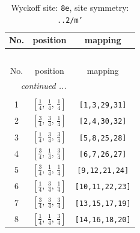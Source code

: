 \documentclass[fleqn,8pt]{jsarticle}
\begin{document}
\renewcommand{\arraystretch}{1.2}
\begin{longtable}{ccc}
\caption{Wyckoff site: {\tt 8e}, site symmetry: {\tt ..2/m'}}
 \\
 \hline \hline
No. & position & mapping \\ \hline \endfirsthead

\multicolumn{2}{l}{\tablename\ \thetable{}} \\
 \hline \hline
No. & position & mapping \\ \hline \endhead

 \hline \hline
\multicolumn{2}{r}{\footnotesize\it continued ...} \\ \endfoot

 \hline \hline
\multicolumn{2}{r}{} \\ \endlastfoot

1 & $\left[ \frac{1}{4},\, \frac{1}{4},\, \frac{1}{4} \right]$ & {\tt [1,3,29,31]} \\ \hline
2 & $\left[ \frac{3}{4},\, \frac{3}{4},\, \frac{1}{4} \right]$ & {\tt [2,4,30,32]} \\ \hline
3 & $\left[ \frac{1}{4},\, \frac{3}{4},\, \frac{3}{4} \right]$ & {\tt [5,8,25,28]} \\ \hline
4 & $\left[ \frac{3}{4},\, \frac{1}{4},\, \frac{3}{4} \right]$ & {\tt [6,7,26,27]} \\ \hline
5 & $\left[ \frac{3}{4},\, \frac{1}{4},\, \frac{1}{4} \right]$ & {\tt [9,12,21,24]} \\ \hline
6 & $\left[ \frac{1}{4},\, \frac{3}{4},\, \frac{1}{4} \right]$ & {\tt [10,11,22,23]} \\ \hline
7 & $\left[ \frac{3}{4},\, \frac{3}{4},\, \frac{3}{4} \right]$ & {\tt [13,15,17,19]} \\ \hline
8 & $\left[ \frac{1}{4},\, \frac{1}{4},\, \frac{3}{4} \right]$ & {\tt [14,16,18,20]} \\
\end{longtable}
\renewcommand{\arraystretch}{1.2}
\end{document}
